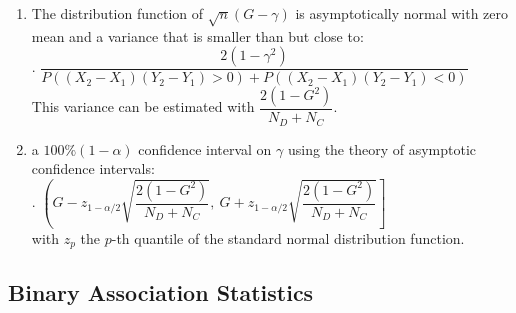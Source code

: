 \begin{enumerate}
    \item The distribution function of $\sqrt{n}(G - \gamma)$ is asymptotically normal with zero mean and a variance that is smaller than but close to:
    \hfill \cite{statistics/book/Statistics-for-Data-Scientists/Maurits-Kaptein}
    \\[0.3cm]
    .\hfill
    $
        \dfrac{
            2(1 - \gamma^2)
        }{
            P((X_2 - X_1)(Y_2 - Y_1) > 0) + P((X_2 - X_1)(Y_2 - Y_1) < 0)
        }
    $
    \hfill \cite{statistics/book/Statistics-for-Data-Scientists/Maurits-Kaptein}
    \\[0.3cm]
    This variance can be estimated with $\dfrac{2(1 - G^2)}{N_D + N_C}$.
    \hfill \cite{statistics/book/Statistics-for-Data-Scientists/Maurits-Kaptein}

    \item a $100\%(1 - \alpha)$ confidence interval on $\gamma$ using the theory of asymptotic confidence intervals:
    \hfill \cite{statistics/book/Statistics-for-Data-Scientists/Maurits-Kaptein}
    \\[0.3cm]
    .\hfill
    $
        \left(
            G - z_{1-\alpha/2} \sqrt{\dfrac{2(1 - G^2)}{N_D + N_C}},
            \ G + z_{1-\alpha/2} \sqrt{\dfrac{2(1 - G^2)}{N_D + N_C}}
        \right]
    $
    \hfill \cite{statistics/book/Statistics-for-Data-Scientists/Maurits-Kaptein}
    \\[0.3cm]
    with $z_p$ the $p$-th quantile of the standard normal distribution function.
    \hfill \cite{statistics/book/Statistics-for-Data-Scientists/Maurits-Kaptein}
\end{enumerate}








\subsection{Binary Association Statistics}

